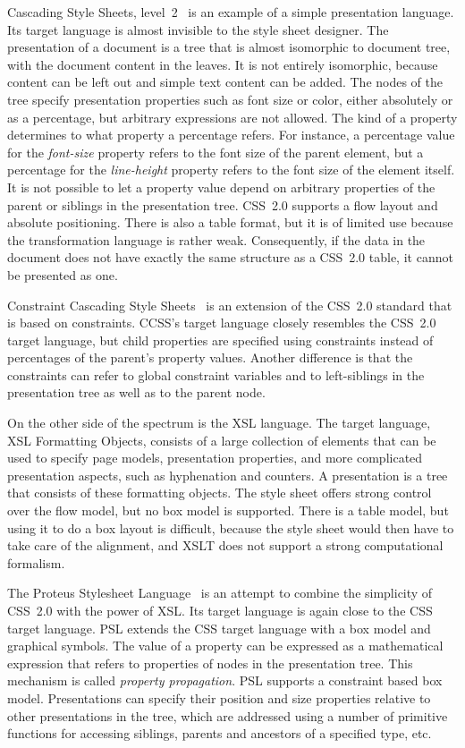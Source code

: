  Cascading Style Sheets, level~2~\cite{css} is an example of a simple presentation language. Its target language is almost invisible to the style sheet designer. The presentation of a document is a tree that is almost isomorphic to document tree, with the document content in the leaves. It is not entirely isomorphic, because content can be left out and simple text content can be added. The nodes of the tree specify presentation properties such as font size or color, either absolutely or as a percentage, but arbitrary expressions are not allowed. The kind of a property determines to what property a percentage refers. For instance, a percentage value for the {\em font-size} property refers to the font size of the parent element, but a percentage for the {\em line-height} property refers to the font size of the element itself. It is not possible to let a property value depend on arbitrary properties of the parent or siblings in the presentation tree. CSS~2.0 supports a flow layout and absolute positioning. There is also a table format, but it is of limited use because the transformation language is rather weak. Consequently, if the data in the document does not have exactly the same structure as a CSS~2.0 table, it cannot be presented as one.

 Constraint Cascading Style Sheets~\cite{ccss} is an extension of the CSS~2.0 standard that is based on constraints. CCSS's target language closely resembles the CSS~2.0 target language, but child properties are specified using constraints instead of percentages of the parent's property values. Another difference is that the constraints can refer to global constraint variables and to left-siblings in the presentation tree as well as to the parent node. 

 On the other side of the spectrum is the XSL language. The target language, XSL Formatting Objects, consists of a large collection of elements that can be used to specify page models, presentation properties, and more complicated presentation aspects, such as hyphenation and counters. A presentation is a tree that consists of these formatting objects. The style sheet offers strong control over the flow model, but no box model is supported. There is a table model, but using it to do a box layout is difficult, because the style sheet would then have to take care of the alignment, and XSLT does not support a strong computational formalism.

 The Proteus Stylesheet Language~\cite{psl} is an attempt to combine the simplicity of CSS~2.0 with the power of XSL. Its target language is again close to the CSS target language. PSL extends the CSS target language with a box model and graphical symbols. The value of a property can be expressed as a mathematical expression that refers to properties of nodes in the presentation tree. This mechanism is called {\em property propagation}. PSL supports a constraint based box model. Presentations can specify their position and size properties relative to other presentations in the tree, which are addressed using a number of primitive functions for accessing siblings, parents and ancestors of a specified type, etc.

